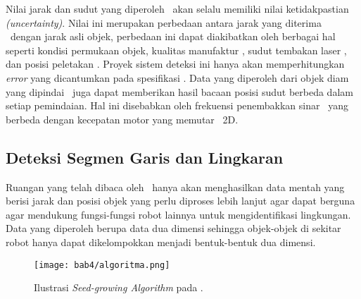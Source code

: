 Nilai jarak dan sudut yang diperoleh \lidar\ akan selalu memiliki nilai ketidakpastian \textit{(uncertainty)}. Nilai ini merupakan perbedaan antara jarak yang diterima \lidar\ dengan jarak asli objek, perbedaan ini dapat diakibatkan oleh berbagai hal seperti kondisi permukaan objek, kualitas manufaktur \lidar, sudut tembakan laser \lidar, dan posisi peletakan \lidar\cite{d0}. Proyek sistem deteksi ini hanya akan memperhitungkan \textit{error} yang dicantumkan pada spesifikasi \lidar. %
Data yang diperoleh dari objek diam yang dipindai \lidar\ juga dapat memberikan hasil bacaan posisi sudut berbeda dalam setiap pemindaian. Hal ini disebabkan oleh frekuensi penembakkan sinar \lidar\ yang berbeda dengan kecepatan motor yang memutar \lidar\ 2D.

\subsection{Deteksi Segmen Garis dan Lingkaran}
\label{sec:Deteksi}

Ruangan yang telah dibaca oleh \lidar\ hanya akan menghasilkan data mentah yang berisi jarak dan posisi objek yang perlu diproses lebih lanjut agar dapat berguna agar mendukung fungsi-fungsi robot lainnya untuk mengidentifikasi lingkungan. Data yang diperoleh berupa data dua dimensi sehingga objek-objek di sekitar robot hanya dapat dikelompokkan menjadi bentuk-bentuk dua dimensi. 

\begin{figure}[H]
    \centering
    \texttt{[image: bab4/algoritma.png]}
    \caption{Ilustrasi \textit{Seed-growing Algorithm} pada \lidar.}
    \label{fig:Ch04_ilustrasi_algoritma}
\end{figure}

